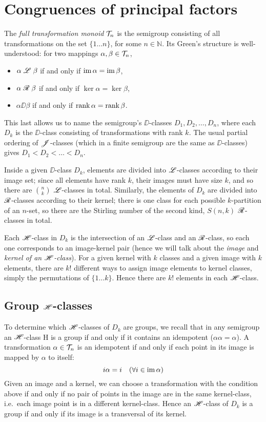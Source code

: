 \section{Congruences of principal factors}
\label{sec:princfact}

The \textit{full transformation monoid} $\mathcal{T}_n$ is the semigroup consisting of all
transformations on the set $\{1 \dots n\}$, for some $n \in \mathbb{N}$.  Its
Green's structure is well-understood: for two mappings $\alpha, \beta
\in \mathcal{T}_n$,

\begin{itemize}
\item $\alpha \mathrel{\mathscr{L}} \beta$ if and only if $\operatorname{im} \alpha = \operatorname{im} \beta$,
\item $\alpha \mathrel{\mathscr{R}} \beta$ if and only if $\ker \alpha = \ker \beta$,
\item $\alpha \DD \beta$ if and only if $\operatorname{rank} \alpha = \operatorname{rank} \beta$.
\end{itemize}

This last allows us to name the semigroup's $\DD$-classes $D_1, D_2,
\dots, D_n$, where each $D_k$ is the $\DD$-class consisting of
transformations with rank $k$.  The usual partial ordering of
$\mathrel{\mathscr{J}}$-classes \cite[p.47]{howie} (which in a finite semigroup are the
same as $\DD$-classes) gives $D_1 < D_2 < \dots < D_n$.

Inside a given $\DD$-class $D_k$, elements are divided into
$\mathrel{\mathscr{L}}$-classes according to their image set; since all elements have rank
$k$, their images must have size $k$, and so there are $\binom{n}{k}$
$\mathrel{\mathscr{L}}$-classes in total.  Similarly, the elements of $D_k$ are divided
into $\mathrel{\mathscr{R}}$-classes according to their kernel; there is one class for
each possible $k$-partition of an $n$-set, so there are the Stirling number of
the second kind, $S(n,k)$ $\mathrel{\mathscr{R}}$-classes in total.

Each $\mathrel{\mathscr{H}}$-class in $D_k$ is the intersection of an $\mathrel{\mathscr{L}}$-class
and an $\mathrel{\mathscr{R}}$-class, so each one corresponds to an image-kernel pair
(hence we will talk about the \textit{image} and \textit{kernel of an $\mathrel{\mathscr{H}}$-class}).
For a given kernel with $k$ classes and a given image with $k$ elements, there
are $k!$ different ways to assign image elements to kernel classes, simply the
permutations of $\{1 \dots k\}$.  Hence there are $k!$ elements in each
$\mathrel{\mathscr{H}}$-class.

\subsection{Group $\mathrel{\mathscr{H}}$-classes}
\label{sec:grouphclasses}
To determine which $\mathrel{\mathscr{H}}$-classes of $D_k$ are groups, we recall that in any
semigroup an $\mathrel{\mathscr{H}}$-class H is a group if and only if it contains an idempotent
($\alpha \alpha = \alpha$).  A transformation $\alpha \in \mathcal{T}_n$ is an idempotent
if and only if each point in its image is mapped by $\alpha$ to itself:
$$i \alpha = i \quad (\forall i \in \operatorname{im} \alpha)$$
Given an image and a kernel, we can choose a transformation with the condition
above if and only if no pair of points in the image are in the same
kernel-class, i.e.~each image point is in a different kernel-class.
Hence an $\mathrel{\mathscr{H}}$-class of $D_k$ is a group if and only if its image is a transversal
of its kernel.

